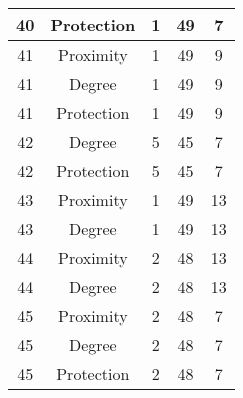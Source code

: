 \documentclass[results.tex]{subfiles}
\begin{document}
\begin{center}
\begin{tabular}{| c || c | c | c | c |}
            \hline
            40                      & Protection                   & 1                      & 49                      & 7                    \\
            \hline
            41                      & Proximity                    & 1                      & 49                      & 9                    \\
            \hline
            41                      & Degree                       & 1                      & 49                      & 9                    \\
            \hline
            41                      & Protection                   & 1                      & 49                      & 9                    \\
            \hline
            42                      & Degree                       & 5                      & 45                      & 7                    \\
            \hline
            42                      & Protection                   & 5                      & 45                      & 7                    \\
            \hline
            43                      & Proximity                    & 1                      & 49                      & 13                   \\
            \hline
            43                      & Degree                       & 1                      & 49                      & 13                   \\
            \hline
            44                      & Proximity                    & 2                      & 48                      & 13                   \\
            \hline
            44                      & Degree                       & 2                      & 48                      & 13                   \\
            \hline
            45                      & Proximity                    & 2                      & 48                      & 7                    \\
            \hline
            45                      & Degree                       & 2                      & 48                      & 7                    \\
            \hline
            45                      & Protection                   & 2                      & 48                      & 7                    \\

\end{tabular}
\end{center}
\end{document}
